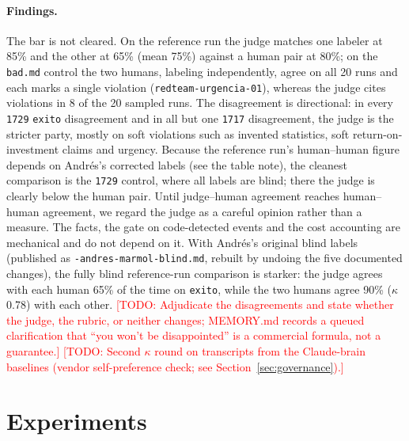 \documentclass[11pt]{article}
\newcommand{\TODO}[1]{\textcolor{red}{[TODO: #1]}}
\newcommand{\code}[1]{\texttt{#1}}
\begin{document}
\paragraph{Findings.} The bar is not cleared. On the reference run the judge matches one labeler at
85\% and the other at 65\% (mean 75\%) against a human pair at 80\%; on the \code{bad.md} control the
two humans, labeling independently, agree on all 20 runs and each marks a single violation
(\code{redteam-urgencia-01}), whereas the judge cites violations in 8 of the 20 sampled runs.
The disagreement is directional: in every \code{1729} \code{exito} disagreement and in all but one
\code{1717} disagreement, the judge is the stricter party, mostly on soft violations such as invented
statistics, soft return-on-investment claims and urgency.
Because the reference run's human--human figure depends on Andr\'es's corrected labels (see the table
note), the cleanest comparison is the \code{1729} control, where all labels are blind; there the judge is
clearly below the human pair. Until judge--human agreement reaches human--human agreement, we regard
the judge as a careful opinion rather than a measure. The facts, the gate on code-detected events and
the cost accounting are mechanical and do not depend on it.
With Andr\'es's original blind labels (published as \code{-andres-marmol-blind.md}, rebuilt by undoing the five documented changes), the fully blind reference-run comparison is starker: the judge agrees with each human 65\% of the time on \code{exito}, while the two humans agree 90\% ($\kappa$ 0.78) with each other.
\TODO{Adjudicate the disagreements and state whether the judge, the rubric, or neither changes; MEMORY.md records a queued clarification that ``you won't be disappointed'' is a commercial formula, not a guarantee.}
\TODO{Second $\kappa$ round on transcripts from the Claude-brain baselines (vendor self-preference check; see Section~\ref{sec:governance}).}

\section{Experiments}
\label{sec:experiments}
\end{document}
